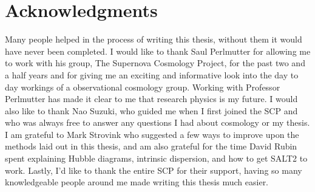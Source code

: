\section{Acknowledgments}
Many people helped in the process of writing this thesis, without them it would have never been completed. I would like to thank Saul Perlmutter for allowing me to work with his group, The Supernova Cosmology Project, for the past two and a half years and for giving me an exciting and informative look into the day to day workings of a observational cosmology group. Working with Professor Perlmutter has made it clear to me that research physics is my future. I would also like to thank Nao Suzuki, who guided me when I first joined the SCP and who was always free to answer any questions I had about cosmology or my thesis. I am grateful to Mark Strovink who suggested a few ways to improve upon the methods laid out in this thesis, and am also grateful for the time David Rubin spent explaining Hubble diagrams, intrinsic dispersion, and how to get SALT2 to work. Lastly, I'd like to thank the entire SCP for their support, having so many knowledgeable people around me made writing this thesis much easier.
